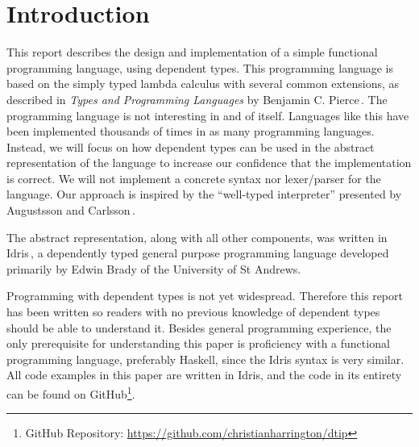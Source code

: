 \section{Introduction}
\label{sec:introduction}

This report describes the design and implementation of a simple functional programming language, using dependent types. This programming language is based on the simply typed lambda calculus with several common extensions, as described in \emph{Types and Programming Languages} by Benjamin C. Pierce\,\cite{Pierce:TypeSystems}. The programming language is not interesting in and of itself. Languages like this have been implemented thousands of times in as many programming languages. Instead, we will focus on how dependent types can be used in the abstract representation of the language to increase our confidence that the implementation is correct. We will not implement a concrete syntax nor lexer/parser for the language. Our approach is inspired by the ``well-typed interpreter'' presented by Augustsson and Carlsson\,\cite{Augustsson99anexercise}. 

The abstract representation, along with all other components, was written in Idris\,\cite{Idris}, a dependently typed general purpose programming language developed primarily by Edwin Brady of the University of St Andrews.  

Programming with dependent types is not yet widespread. Therefore this report has been written so readers with no previous knowledge of dependent types should be able to understand it. Besides general programming experience, the only prerequisite for understanding this paper is proficiency with a functional programming language, preferably Haskell, since the Idris syntax is very similar. All code examples in this paper are written in Idris, and the code in its entirety can be found on GitHub\footnote{GitHub Repository: \url{https://github.com/christianharrington/dtip}}.

